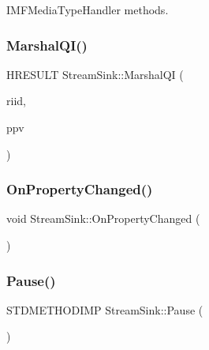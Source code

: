 I\+M\+F\+Media\+Type\+Handler methods. 

\mbox{\label{class_stream_sink_a1fc5f971e1425577d406886a92dd3f78}} 
\subsubsection{\texorpdfstring{Marshal\+Q\+I()}{MarshalQI()}}
{\footnotesize\ttfamily H\+R\+E\+S\+U\+LT Stream\+Sink\+::\+Marshal\+QI (\begin{DoxyParamCaption}\item[{R\+E\+F\+I\+ID}]{riid,  }\item[{L\+P\+V\+O\+ID $\ast$}]{ppv }\end{DoxyParamCaption})\hspace{0.3cm}{\ttfamily [inline]}}

\mbox{\label{class_stream_sink_a4105ab972d1e6059209cafbca68b31cf}} 
\subsubsection{\texorpdfstring{On\+Property\+Changed()}{OnPropertyChanged()}}
{\footnotesize\ttfamily void Stream\+Sink\+::\+On\+Property\+Changed (\begin{DoxyParamCaption}{ }\end{DoxyParamCaption})\hspace{0.3cm}{\ttfamily [inline]}}

\mbox{\label{class_stream_sink_a379fddd00072cd2563650493e51b1a1c}} 
\subsubsection{\texorpdfstring{Pause()}{Pause()}}
{\footnotesize\ttfamily S\+T\+D\+M\+E\+T\+H\+O\+D\+I\+MP Stream\+Sink\+::\+Pause (\begin{DoxyParamCaption}{ }\end{DoxyParamCaption})\hspace{0.3cm}{\ttfamily [inline]}}


